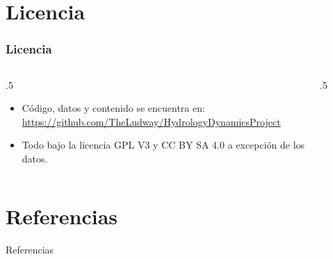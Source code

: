 \documentclass[17pt, t, lualatex]{beamer}
\begin{document}
\section{Licencia}

\insertsectionpage


\begin{frame}
  \frametitle{Licencia}

  \begin{columns}
    \begin{column}{.5\textwidth}
      \begin{itemize}
        \item Código, datos y contenido se encuentra en: \url{https://github.com/TheLudway/HydrologyDynamicsProject} 
        \item Todo bajo la licencia GPL V3 y CC BY SA 4.0 a excepción de los datos.
      \end{itemize}
    \end{column}

    \begin{column}{.5\textwidth}
      \begin{figure}[ht]
        \centering
        \href{https://www.gnu.org/licenses/gpl-3.0.txt}{}
      \end{figure}
    \end{column}
  \end{columns}

\end{frame}


\section{Referencias}

\insertsectionpage
\begin{frame}[allowframebreaks]{Referencias}
  \printbibliography
\end{frame}


\insertendpage
\end{document}
